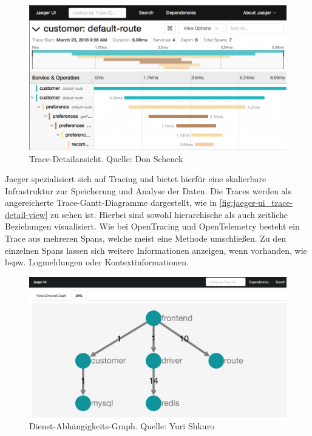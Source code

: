 \begin{figure}
\centering
\includegraphics[width=\linewidth]{img/03_methoden/redhat_jaeger-ui_trace-detail-view.png}
\caption{Trace-Detailansicht. Quelle: Don Schenck \cite{JaegerIstioTracing}}
\label{fig:jaeger-ui_trace-detail-view}
\end{figure}

Jaeger spezialisiert sich auf Tracing und bietet hierfür eine skalierbare Infrastruktur zur Speicherung und Analyse der Daten. Die Traces werden als angereicherte Trace-Gantt-Diagramme dargestellt, wie in \autoref{fig:jaeger-ui_trace-detail-view} zu sehen ist. Hierbei sind sowohl hierarchische als auch zeitliche Beziehungen visualisiert. Wie bei OpenTracing und OpenTelemetry besteht ein Trace aus mehreren Spans, welche meist eine Methode umschließen. Zu den einzelnen Spans lassen sich weitere Informationen anzeigen, wenn vorhanden, wie bspw. Logmeldungen oder Kontextinformationen.

\begin{figure}
\centering
\includegraphics[width=\linewidth]{img/03_methoden/medium_jaeger-ui_dependency-graph.png}
\caption{Dienst-Abhängigkeits-Graph. Quelle: Yuri Shkuro \cite{JaegerTakeOpenTracingForARide}}
\label{fig:jaeger-ui_dependency-graph}
\end{figure}

